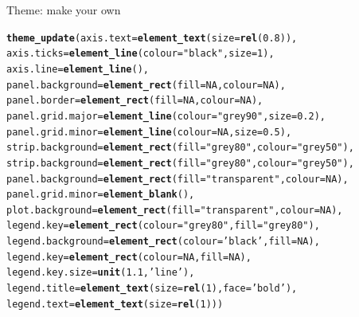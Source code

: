 \documentclass{beamer}\usepackage[]{graphicx}\usepackage[]{color}
\makeatletter
\newcommand{\hlnum}[1]{\textcolor[rgb]{0.686,0.059,0.569}{#1}}%
\newcommand{\hlstr}[1]{\textcolor[rgb]{0.192,0.494,0.8}{#1}}%
\newcommand{\hlstd}[1]{\textcolor[rgb]{0.345,0.345,0.345}{#1}}%
\newcommand{\hlkwc}[1]{\textcolor[rgb]{0.333,0.667,0.333}{#1}}%
\newcommand{\hlkwd}[1]{\textcolor[rgb]{0.737,0.353,0.396}{\textbf{#1}}}%
\newenvironment{kframe}{%
 \def\at@end@of@kframe{}%
 \ifinner\ifhmode%
  \def\at@end@of@kframe{\end{minipage}}%
  \begin{minipage}{\columnwidth}%
 \fi\fi%
 \def\FrameCommand##1{\hskip\@totalleftmargin \hskip-\fboxsep
 \colorbox{shadecolor}{##1}\hskip-\fboxsep
     \hskip-\linewidth \hskip-\@totalleftmargin \hskip\columnwidth}%
 \MakeFramed {\advance\hsize-\width
   \@totalleftmargin\z@ \linewidth\hsize
   \@setminipage}}%
 {\par\unskip\endMakeFramed%
 \at@end@of@kframe}
\newenvironment{knitrout}{}{} %
\makeatother
\begin{document}
\begin{frame}[fragile]{Theme: make your own}
\begin{knitrout}\footnotesize
{}\color{fgcolor}\begin{kframe}
\begin{alltt}
\hlkwd{theme_update}\hlstd{(}\hlkwc{axis.text} \hlstd{=} \hlkwd{element_text}\hlstd{(}\hlkwc{size} \hlstd{=} \hlkwd{rel}\hlstd{(}\hlnum{0.8}\hlstd{)),}
             \hlkwc{axis.ticks} \hlstd{=} \hlkwd{element_line}\hlstd{(}\hlkwc{colour} \hlstd{=} \hlstr{"black"}\hlstd{,} \hlkwc{size}\hlstd{=}\hlnum{1}\hlstd{),}
             \hlkwc{axis.line} \hlstd{=} \hlkwd{element_line}\hlstd{(),}
             \hlkwc{panel.background} \hlstd{=} \hlkwd{element_rect}\hlstd{(}\hlkwc{fill} \hlstd{=} \hlnum{NA}\hlstd{,} \hlkwc{colour} \hlstd{=} \hlnum{NA}\hlstd{),}
             \hlkwc{panel.border} \hlstd{=} \hlkwd{element_rect}\hlstd{(}\hlkwc{fill} \hlstd{=} \hlnum{NA}\hlstd{,} \hlkwc{colour} \hlstd{=} \hlnum{NA}\hlstd{),}
             \hlkwc{panel.grid.major} \hlstd{=} \hlkwd{element_line}\hlstd{(}\hlkwc{colour} \hlstd{=} \hlstr{"grey90"}\hlstd{,} \hlkwc{size} \hlstd{=} \hlnum{0.2}\hlstd{),}
             \hlkwc{panel.grid.minor} \hlstd{=} \hlkwd{element_line}\hlstd{(}\hlkwc{colour} \hlstd{=} \hlnum{NA}\hlstd{,} \hlkwc{size} \hlstd{=} \hlnum{0.5}\hlstd{),}
             \hlkwc{strip.background} \hlstd{=} \hlkwd{element_rect}\hlstd{(}\hlkwc{fill} \hlstd{=} \hlstr{"grey80"}\hlstd{,}\hlkwc{colour} \hlstd{=} \hlstr{"grey50"}\hlstd{),}
             \hlkwc{strip.background} \hlstd{=} \hlkwd{element_rect}\hlstd{(}\hlkwc{fill} \hlstd{=} \hlstr{"grey80"}\hlstd{,}\hlkwc{colour} \hlstd{=} \hlstr{"grey50"}\hlstd{),}
             \hlkwc{panel.background} \hlstd{=} \hlkwd{element_rect}\hlstd{(}\hlkwc{fill} \hlstd{=} \hlstr{"transparent"}\hlstd{,} \hlkwc{colour} \hlstd{=} \hlnum{NA}\hlstd{),}
             \hlkwc{panel.grid.minor} \hlstd{=} \hlkwd{element_blank}\hlstd{(),}
             \hlkwc{plot.background} \hlstd{=} \hlkwd{element_rect}\hlstd{(}\hlkwc{fill} \hlstd{=} \hlstr{"transparent"}\hlstd{,} \hlkwc{colour} \hlstd{=} \hlnum{NA}\hlstd{),}
             \hlkwc{legend.key} \hlstd{=} \hlkwd{element_rect}\hlstd{(}\hlkwc{colour} \hlstd{=} \hlstr{"grey80"}\hlstd{,} \hlkwc{fill}\hlstd{=} \hlstr{"grey80"}\hlstd{),}
             \hlkwc{legend.background} \hlstd{=} \hlkwd{element_rect}\hlstd{(}\hlkwc{colour} \hlstd{=} \hlstr{'black'}\hlstd{,} \hlkwc{fill} \hlstd{=} \hlnum{NA}\hlstd{),}
             \hlkwc{legend.key} \hlstd{=} \hlkwd{element_rect}\hlstd{(}\hlkwc{colour} \hlstd{=} \hlnum{NA}\hlstd{,}\hlkwc{fill}\hlstd{=}\hlnum{NA}\hlstd{),}
             \hlkwc{legend.key.size} \hlstd{=} \hlkwd{unit}\hlstd{(}\hlnum{1.1}\hlstd{,}\hlstr{'line'}\hlstd{),}
             \hlkwc{legend.title} \hlstd{=} \hlkwd{element_text}\hlstd{(}\hlkwc{size} \hlstd{=} \hlkwd{rel}\hlstd{(}\hlnum{1}\hlstd{),} \hlkwc{face} \hlstd{=} \hlstr{'bold'}\hlstd{),}
             \hlkwc{legend.text} \hlstd{=} \hlkwd{element_text}\hlstd{(}\hlkwc{size} \hlstd{=} \hlkwd{rel}\hlstd{(}\hlnum{1}\hlstd{)))}
\end{alltt}
\end{kframe}
\end{knitrout}
\end{frame}
\end{document}
